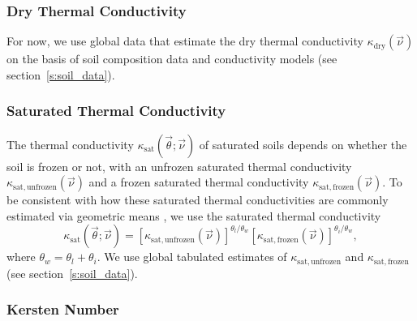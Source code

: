 \documentclass{report}
\begin{document}
\subsubsection{Dry Thermal Conductivity}

For now, we use global data that estimate the dry thermal conductivity $\kappa_{\mathrm{dry}}(\vec{\nu})$ on the basis of soil composition data and conductivity models \citep{Dai19a} (see section~\ref{s:soil_data}). 

\subsubsection{Saturated Thermal Conductivity}

The thermal conductivity $\kappa_{\mathrm{sat}}(\vec{\theta}; \vec{\nu})$ of saturated soils depends on whether the soil is frozen or not, with an unfrozen saturated thermal conductivity $\kappa_{\mathrm{sat, unfrozen}}(\vec{\nu})$ and a frozen saturated thermal conductivity  $\kappa_{\mathrm{sat, frozen}}(\vec{\nu})$. To be consistent with how these saturated thermal conductivities are commonly estimated via geometric means \citep[e.g.,][]{Balland05a}, we use the saturated thermal conductivity
\begin{equation}\label{e:saturated_theral_conductivity}
    \kappa_{\mathrm{sat}}(\vec{\theta}; \vec{\nu}) = \left[\kappa_{\mathrm{sat, unfrozen}}(\vec{\nu})\right]^{\theta_l/\theta_w}
    \left[\kappa_{\mathrm{sat, frozen}}(\vec{\nu})\right]^{\theta_i/\theta_w},
\end{equation}
where $\theta_w=\theta_l + \theta_i$. We use global tabulated estimates of $\kappa_{\mathrm{sat, unfrozen}}$ and $\kappa_{\mathrm{sat, frozen}}$ \citep{Dai19a} (see section~\ref{s:soil_data}). 

\subsubsection{Kersten Number}
\end{document}
